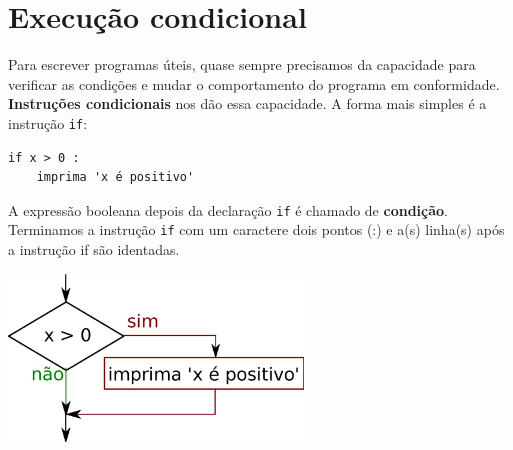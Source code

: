 
\section{Execução condicional}
\label{execucao condicional}


Para escrever programas úteis, quase sempre precisamos da capacidade
para verificar as condições e mudar o comportamento do programa
em conformidade.  {\bf Instruções condicionais} nos dão essa capacidade. A
forma mais simples é a instrução {\tt if}:


\beforeverb
\begin{verbatim}
if x > 0 :
    imprima 'x é positivo'
\end{verbatim}
\afterverb
%

A expressão booleana depois da declaração {\tt if} é
chamado de {\bf condição}. Terminamos a instrução {\tt if}
com um caractere dois pontos (:) e a(s) linha(s)
após a instrução if são identadas.


\beforefig
\centerline{\includegraphics[height=1.75in]{figs2/if.eps}}
\afterfig

